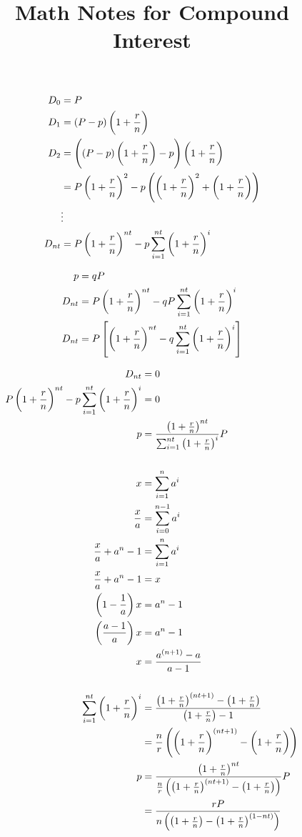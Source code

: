 \documentclass[12pt]{article}
\title{Math Notes for Compound Interest}
\author{}
\date{}
\begin{document}
\maketitle

\begin{align*}
    D_0 &= P\\
    D_1 &= (P - p) \del{1 + \frac{r}{n}}\\
    D_2 &= \del{(P - p) \del{1 + \frac{r}{n}} - p} \del{1 + \frac{r}{n}}\\
        &= P \del{1 + \frac{r}{n}}^2 - p \del{\del{1 + \frac{r}{n}}^2 + \del{1 + \frac{r}{n}}}\\
        &\vdots\\
    D_{nt} &= P \del{1 + \frac{r}{n}}^{nt} - p \sum_{i = 1}^{nt} \del{1 + \frac{r}{n}}^i\\
\end{align*}

\begin{align*}
    p &= qP\\
    D_{nt} &= P \del{1 + \frac{r}{n}}^{nt} - qP \sum_{i = 1}^{nt} \del{1 + \frac{r}{n}}^i\\
    D_{nt} &= P \sbr{\del{1 + \frac{r}{n}}^{nt} - q \sum_{i = 1}^{nt} \del{1 + \frac{r}{n}}^i}
\end{align*}

\begin{align*}
    D_{nt} &= 0\\
    P \del{1 + \frac{r}{n}}^{nt} - p \sum_{i = 1}^{nt} \del{1 + \frac{r}{n}}^i &= 0\\
    p &= \frac{\del{1 + \frac{r}{n}}^{nt}}{\sum_{i = 1}^{nt} \del{1 + \frac{r}{n}}^i} P\\
    \\
    x &= \sum_{i = 1}^{n} a^i\\
    \frac{x}{a} &= \sum_{i = 0}^{n - 1} a^i\\
    \frac{x}{a} + a^n - 1 &= \sum_{i = 1}^{n} a^i\\
    \frac{x}{a} + a^n - 1 &= x\\
    \del{1 - \frac{1}{a}} x &= a^n - 1\\
    \del{\frac{a - 1}{a}} x &= a^n - 1\\
    x &= \frac{a^{(n+1)} - a}{a - 1}\\
    \\
    \sum_{i = 1}^{nt} \del{1 + \frac{r}{n}}^i
      &= \frac{\del{1 + \frac{r}{n}}^{(nt+1)} - \del{1 + \frac{r}{n}}}{\del{1 + \frac{r}{n}} - 1}\\
      &= \frac{n}{r} \del{\del{1 + \frac{r}{n}}^{(nt+1)} - \del{1 + \frac{r}{n}}}\\
    p &= \frac{\del{1 + \frac{r}{n}}^{nt}}{\frac{n}{r} \del{\del{1 + \frac{r}{n}}^{(nt+1)} - \del{1 + \frac{r}{n}}}} P\\
      &= \frac{rP}{n \del{\del{1 + \frac{r}{n}} - \del{1 + \frac{r}{n}}^{(1 - nt)}}}\\
\end{align*}
\end{document}
